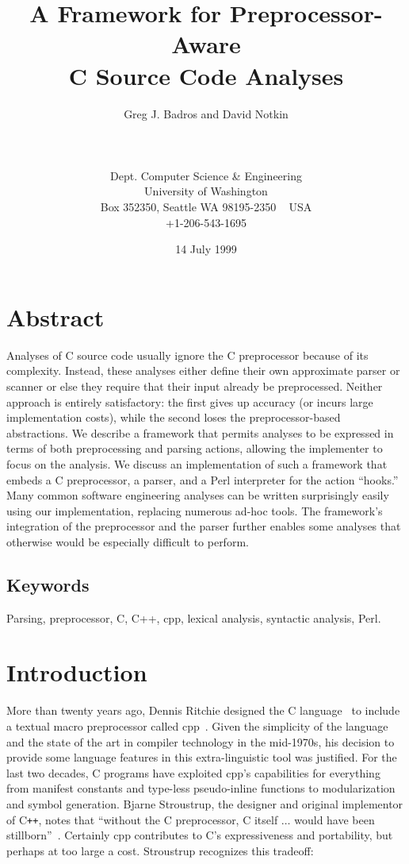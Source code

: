 \documentclass{article}
\title{A Framework for Preprocessor-Aware \\ C Source Code Analyses}
\author{
        \hspace*{-2ex}
        \parbox{4in} {\begin{center}
        Greg J. Badros and David Notkin\\
        \end{center}}\\
        \parbox{4in} {\begin{center}
            \begin{small}
              Dept. Computer Science \& Engineering\\
              University of Washington \\
              Box 352350, Seattle WA  98195-2350 ~ USA \\
              +1-206-543-1695\\
              \email{\{gjb,notkin\}@cs.washington.edu}
            \end{small}
        \end{center} }
}
\date{14 July 1999}
\newcommand{\Cpp}{\mbox{\textsf{cpp}}}
\newcommand{\CPP}{\mbox{C\texttt{++}}}
\newcommand{\C}{\mbox{C}}
\begin{document}
\maketitle

\thispagestyle{empty}  %

\pagestyle{plain}

\section*{Abstract}
\label{sec:abstract}
Analyses of \C{} source code usually ignore the \C{} preprocessor
because of its complexity.  Instead, these analyses either define their
own approximate parser or scanner or else they require that their
input already be preprocessed.  Neither approach is entirely
satisfactory: the first gives up accuracy (or incurs large
implementation costs), while the second loses the preprocessor-based
abstractions.  We describe a framework that permits analyses to be
expressed in terms of both preprocessing and parsing actions, allowing
the implementer to focus on the analysis.  We discuss an implementation of
such a framework that embeds a \C{} preprocessor, a parser, and a Perl
interpreter for the action ``hooks.''  Many common software engineering
analyses can be written surprisingly easily using our implementation,
replacing numerous ad-hoc tools.  The framework's integration of the
preprocessor and the parser further enables some analyses that otherwise
would be especially difficult to perform.

\subsection*{Keywords}
Parsing, preprocessor, C, C++, cpp, lexical analysis, syntactic analysis, Perl.

\bigskip

\section{Introduction}
\label{sec:intro}
More than twenty years ago, Dennis Ritchie designed the \C{}
language~\cite{Kernighan88} to include a textual macro preprocessor
called \Cpp{}~\cite[Ch.~3]{Harbison91}.  Given the simplicity of the
language and the state of the art in compiler technology in the
mid-1970s, his decision to provide some language features in this
extra-linguistic tool was justified.  For the last two
decades, \C{} programs have exploited \Cpp{}'s capabilities for
everything from manifest constants and type-less pseudo-inline
functions to modularization and symbol generation.  Bjarne
Stroustrup, the designer and original implementor of \CPP{}, notes that
``without the \C{} preprocessor, \C{} itself $\ldots$ would have been
stillborn''~\cite[p.~119]{Stroustrup94}.  Certainly \Cpp{} contributes
to \C{}'s expressiveness and portability, but perhaps at too large a
cost.  Stroustrup recognizes this tradeoff:
\end{document}
